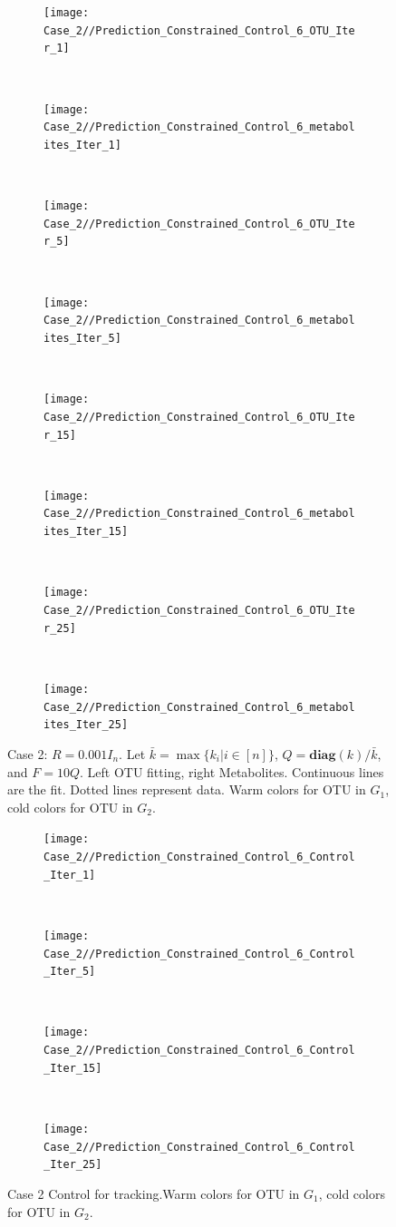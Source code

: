 \documentclass[3p,times]{elsarticle}
\newcommand{\diag}{\textbf{diag}}
\begin{document}
\clearpage
\begin{figure}
	\centering
	\begin{subfigure}[b]{0.32\textheight}
		\texttt{[image: Case\_2//Prediction\_Constrained\_Control\_6\_OTU\_Iter\_1]}
	\end{subfigure}
	~
	\begin{subfigure}[b]{0.32\textheight}
		\texttt{[image: Case\_2//Prediction\_Constrained\_Control\_6\_metabolites\_Iter\_1]}
	\end{subfigure}
	~	
	\begin{subfigure}[b]{0.32\textheight}
		\texttt{[image: Case\_2//Prediction\_Constrained\_Control\_6\_OTU\_Iter\_5]}
	\end{subfigure}
	~
	\begin{subfigure}[b]{0.32\textheight}
		\texttt{[image: Case\_2//Prediction\_Constrained\_Control\_6\_metabolites\_Iter\_5]}
	\end{subfigure}
	~
	\begin{subfigure}[b]{0.32\textheight}
		\texttt{[image: Case\_2//Prediction\_Constrained\_Control\_6\_OTU\_Iter\_15]}
	\end{subfigure}
	~
	\begin{subfigure}[b]{0.32\textheight}
		\texttt{[image: Case\_2//Prediction\_Constrained\_Control\_6\_metabolites\_Iter\_15]}
	\end{subfigure}
	~
	\begin{subfigure}[b]{0.32\textheight}
		\texttt{[image: Case\_2//Prediction\_Constrained\_Control\_6\_OTU\_Iter\_25]}
	\end{subfigure}
	~
	\begin{subfigure}[b]{0.32\textheight}
		\texttt{[image: Case\_2//Prediction\_Constrained\_Control\_6\_metabolites\_Iter\_25]}
	\end{subfigure}
	\caption{Case 2: $R = 0.001 I_n$. Let $\bar{k} =  \max \{k_i| i\in [n] \}$, $Q = \diag(k) /\bar{k}$, and $F = 10Q$. Left OTU fitting, right Metabolites. Continuous lines are the fit. Dotted lines represent data. Warm colors for OTU in $G_1$, cold colors for OTU in $G_2$.}
	\label{Case 2 Metabolites OTU}
\end{figure}
\clearpage
\begin{figure}
	\centering
	\begin{subfigure}[b]{0.32\textheight}
		\texttt{[image: Case\_2//Prediction\_Constrained\_Control\_6\_Control\_Iter\_1]}
	\end{subfigure}
	~
	\begin{subfigure}[b]{0.32\textheight}
		\texttt{[image: Case\_2//Prediction\_Constrained\_Control\_6\_Control\_Iter\_5]}
	\end{subfigure}
	~
	\begin{subfigure}[b]{0.32\textheight}
		\texttt{[image: Case\_2//Prediction\_Constrained\_Control\_6\_Control\_Iter\_15]}
	\end{subfigure}
	~
	\begin{subfigure}[b]{0.32\textheight}
		\texttt{[image: Case\_2//Prediction\_Constrained\_Control\_6\_Control\_Iter\_25]}
	\end{subfigure}
	\caption{Case 2 Control for tracking.Warm colors for OTU in $G_1$, cold colors for OTU in $G_2$.}
	\label{Case 2 Control}
\end{figure}  
\end{document}

